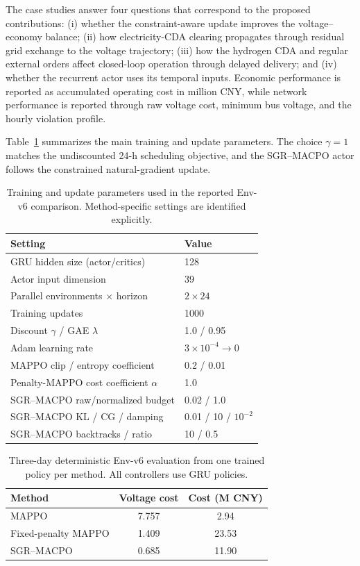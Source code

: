 \documentclass[final,5p,times]{elsarticle}
\newcommand{\method}{SGR--MACPO\xspace}
\begin{document}
The case studies answer four questions that correspond to the proposed contributions: (i) whether the constraint-aware update improves the voltage--economy balance; (ii) how electricity-CDA clearing propagates through residual grid exchange to the voltage trajectory; (iii) how the hydrogen CDA and regular external orders affect closed-loop operation through delayed delivery; and (iv) whether the recurrent actor uses its temporal inputs. Economic performance is reported as accumulated operating cost in million CNY, while network performance is reported through raw voltage cost, minimum bus voltage, and the hourly violation profile.

Table~\ref{tab:training_parameters} summarizes the main training and update parameters. The choice $\gamma=1$ matches the undiscounted 24-h scheduling objective, and the \method actor follows the constrained natural-gradient update.

\begin{table}[t]
\centering
\caption{Training and update parameters used in the reported Env-v6 comparison. Method-specific settings are identified explicitly.}
\label{tab:training_parameters}
\scriptsize
\setlength{\tabcolsep}{4.0pt}
\begin{tabular}{ll}
\toprule
Setting & Value\\
\midrule
GRU hidden size (actor/critics) & 128\\
Actor input dimension & 39\\
Parallel environments $\times$ horizon & $2\times24$\\
Training updates & 1000\\
Discount $\gamma$ / GAE $\lambda$ & 1.0 / 0.95\\
Adam learning rate & $3\times10^{-4}\!\rightarrow0$\\
MAPPO clip / entropy coefficient & 0.2 / 0.01\\
Penalty-MAPPO cost coefficient $\alpha$ & 1.0\\
SGR--MACPO raw/normalized budget & 0.02 / 1.0\\
SGR--MACPO KL / CG / damping & 0.01 / 10 / $10^{-2}$\\
SGR--MACPO backtracks / ratio & 10 / 0.5\\
\bottomrule
\end{tabular}
\end{table}

\begin{table}[t]
\centering
\caption{Three-day deterministic Env-v6 evaluation from one trained policy per method. All controllers use GRU policies.}
\label{tab:main_results}
\scriptsize
\setlength{\tabcolsep}{3.2pt}
\begin{tabular}{lcc}
\toprule
Method & Voltage cost & Cost (M CNY)\\
\midrule
MAPPO & 7.757 & 2.94\\
Fixed-penalty MAPPO & 1.409 & 23.53\\
\method & 0.685 & 11.90\\
\bottomrule
\end{tabular}
\end{table}
\end{document}
